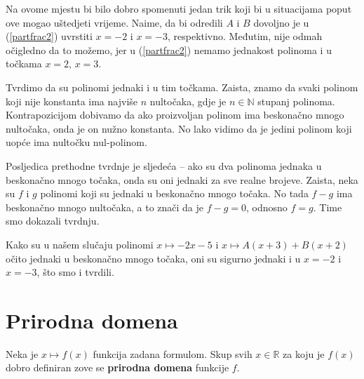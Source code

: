 \begin{remark}
Na ovome mjestu bi bilo dobro spomenuti jedan trik koji bi u situacijama poput ove mogao uštedjeti vrijeme. Naime, da bi odredili $A$ i $B$ dovoljno je u (\ref{partfrac2}) uvrstiti $x=-2$ i $x=-3$, respektivno. Međutim, nije odmah očigledno da to možemo, jer u (\ref{partfrac2}) nemamo jednakost polinoma i u točkama $x=2$, $x=3$. 

Tvrdimo da su polinomi jednaki i u tim točkama. Zaista, znamo da svaki polinom koji nije konstanta ima najviše $n$ nultočaka, gdje je $n\in \mathbb{N}$ stupanj polinoma. Kontrapozicijom dobivamo da ako proizvoljan polinom ima beskonačno mnogo nultočaka, onda je on nužno konstanta. No lako vidimo da je jedini polinom koji uopće ima nultočku nul-polinom. 

Posljedica prethodne tvrdnje je sljedeća -- ako su dva polinoma jednaka u beskonačno mnogo točaka, onda su oni jednaki za sve realne brojeve. Zaista, neka su $f$ i $g$ polinomi koji su jednaki u beskonačno mnogo točaka. No tada $f-g$ ima beskonačno mnogo nultočaka, a to znači da je $f-g=0$, odnosno $f=g$. Time smo dokazali tvrdnju. 

Kako su u našem slučaju polinomi $x\mapsto -2x-5$ i $x\mapsto A(x+3)+B(x+2)$ očito jednaki u beskonačno mnogo točaka, oni su sigurno jednaki i u $x=-2$ i $x=-3$, što smo i tvrdili.
\end{remark}
\section{Prirodna domena}
\begin{remark}
Neka je $x\mapsto f(x)$ funkcija zadana formulom. Skup svih $x\in \mathbb{R}$ za koju je $f(x)$ dobro definiran zove se \textbf{prirodna domena} funkcije $f$.
\end{remark}

